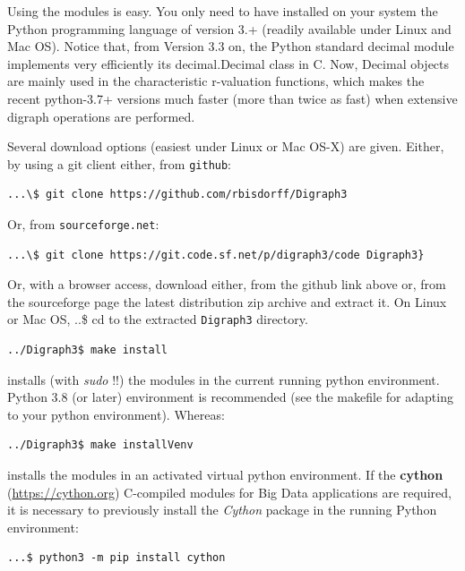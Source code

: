 Using the \Digraph modules is easy. You only need to have installed on your system the Python programming language of version 3.+ (readily available under Linux and Mac OS). Notice that, from Version 3.3 on, the Python standard decimal module implements very efficiently its decimal.Decimal class in C. Now, Decimal objects are mainly used in the \Digraph characteristic r-valuation functions, which makes the recent python-3.7+ versions much faster (more than twice as fast) when extensive digraph operations are performed.

Several download options (easiest under Linux or Mac OS-X) are given. Either, by using a git client either, from \texttt{github}:
\begin{scriptsize}
\begin{verbatim}
...\$ git clone https://github.com/rbisdorff/Digraph3
\end{verbatim}
\end{scriptsize}
Or, from \texttt{sourceforge.net}:
\begin{scriptsize}
\begin{verbatim}
...\$ git clone https://git.code.sf.net/p/digraph3/code Digraph3}
\end{verbatim}
\end{scriptsize}
Or, with a browser access, download either, from the github link above or, from the sourceforge page the latest distribution zip archive and extract it. On Linux or Mac OS, ..\$ cd to the extracted \texttt{Digraph3} directory.
\begin{scriptsize}
\begin{verbatim}
../Digraph3$ make install
\end{verbatim}
\end{scriptsize}
installs (with \emph{sudo} !!) the \Digraph modules in the current running python environment. Python 3.8 (or later) environment is recommended (see the makefile for adapting to your python environment). Whereas:
\begin{scriptsize}
\begin{verbatim}
../Digraph3$ make installVenv
\end{verbatim}          
\end{scriptsize}
installs the \Digraph modules in an activated virtual python environment. If the \textbf{cython} (\href{https://cython.org}{https://cython.org}) C-compiled modules for Big Data applications are required, it is necessary to previously install the \emph{Cython} package in the running Python environment:
\begin{scriptsize}
\begin{verbatim}
...$ python3 -m pip install cython
\end{verbatim}
\end{scriptsize}
